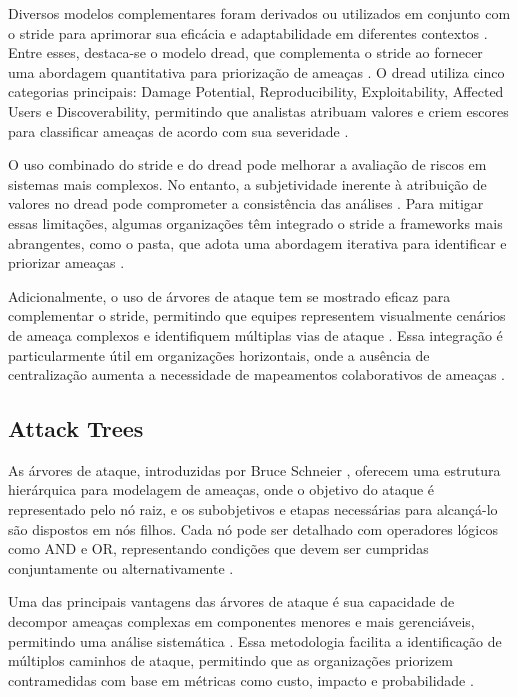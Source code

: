 Diversos modelos complementares foram derivados ou utilizados em
conjunto com o \gls{stride} para aprimorar sua eficácia e adaptabilidade em
diferentes contextos \cite{SoftwareandattackcentricThreatModeling}.
Entre esses, destaca-se o modelo \gls{dread}, que
complementa o \gls{stride} ao fornecer uma abordagem quantitativa para
priorização de ameaças \cite{DREADful}. O \gls{dread} utiliza cinco
categorias principais: Damage Potential, Reproducibility,
Exploitability, Affected Users e Discoverability, permitindo que
analistas atribuam valores e criem escores
para classificar ameaças de acordo com sua severidade
\cite{SoftwareandattackcentricThreatModeling, DREADful}.

O uso combinado do \gls{stride} e do \gls{dread} pode melhorar a avaliação de
riscos em sistemas mais complexos. No entanto, a subjetividade
inerente à atribuição de valores no \gls{dread} pode comprometer a
consistência das análises \cite{DREADful}. Para mitigar essas limitações,
algumas organizações têm integrado o \gls{stride} a frameworks mais
abrangentes, como o \gls{pasta}, que adota uma abordagem iterativa para identificar e
priorizar ameaças \cite{SoftwareandattackcentricThreatModeling}.

Adicionalmente, o uso de árvores de ataque tem se mostrado eficaz para
complementar o \gls{stride}, permitindo que equipes representem visualmente
cenários de ameaça complexos e identifiquem múltiplas vias de ataque
\cite{FoundationsofAttackTrees}.
Essa integração é particularmente útil em organizações horizontais,
onde a ausência de centralização aumenta a necessidade de mapeamentos
colaborativos de ameaças \cite{ThreatModelingdesigningForSecurity}. 

\subsection{Attack Trees}
\label{subsec:attack_trees}

As árvores de ataque, introduzidas por Bruce Schneier
\cite{AttackTrees}, oferecem uma estrutura hierárquica para modelagem
de ameaças, onde o objetivo do ataque é representado pelo nó raiz, e
os subobjetivos e etapas necessárias para alcançá-lo são dispostos em
nós filhos. Cada nó pode ser detalhado com operadores lógicos como AND
e OR, representando condições que devem ser cumpridas conjuntamente ou
alternativamente \cite{FoundationsofAttackTrees}.

Uma das principais vantagens das árvores de ataque é sua capacidade de
decompor ameaças complexas em componentes menores e mais gerenciáveis,
permitindo uma análise sistemática \cite{Energytheftdetectionissues}.
Essa metodologia facilita a identificação de múltiplos caminhos de
ataque, permitindo que as organizações priorizem contramedidas com
base em métricas como custo, impacto e probabilidade
\cite{AnAttackTreeBasedRisk}.

